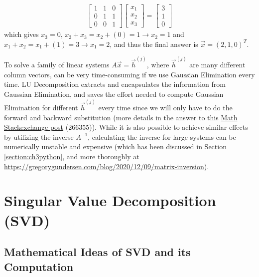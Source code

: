 \begin{solution}
\begin{align*}
\begin{bmatrix}
1 & 1 & 0 \\
0 & 1 & 1 \\
0 & 0 & 1 
\end{bmatrix}
\begin{bmatrix}
x_1 \\
x_2 \\
x_3
\end{bmatrix}
=
\begin{bmatrix}
3 \\
1 \\
0
\end{bmatrix}
\end{align*}
which gives $x_3 = 0$, $x_2 + x_3 = x_2 + (0) = 1 \to x_2 = 1$ and $x_1 + x_2 = x_1 + (1) = 3 \to x_1 = 2$, and thus the final answer is $\vec{x} = (2,1,0)^T$.
\end{solution}

To solve a family of linear systems $A\vec{x} = \vec{h}^{(j)}$, where $\vec{h}^{(j)}$ are many different column vectors, can be very time-consuming if we use Gaussian Elimination every time. LU Decomposition extracts and encapsulates the information from Gaussian Elimination, and saves the effort needed to compute Gaussian Elimination for different $\vec{h}^{(j)}$ every time since we will only have to do the forward and backward substitution (more details in the answer to this \href{https://math.stackexchange.com/questions/266355/necessity-advantage-of-lu-decomposition-over-gaussian-elimination}{Math Stackexchange post} (266355)). While it is also possible to achieve similar effects by utilizing the inverse $A^{-1}$, calculating the inverse for large systems can be numerically unstable and expensive (which has been discussed in Section \ref{section:ch3python}, and more thoroughly at \href{https://gregorygundersen.com/blog/2020/12/09/matrix-inversion}{https://gregorygundersen.com/blog/2020/12/09/matrix-inversion}).

\section{Singular Value Decomposition (SVD)}

\subsection{Mathematical Ideas of SVD and its Computation}

